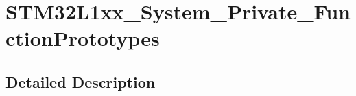\hypertarget{group___s_t_m32_l1xx___system___private___function_prototypes}{\section{S\-T\-M32\-L1xx\-\_\-\-System\-\_\-\-Private\-\_\-\-Function\-Prototypes}
\label{group___s_t_m32_l1xx___system___private___function_prototypes}
}


\subsection{Detailed Description}
